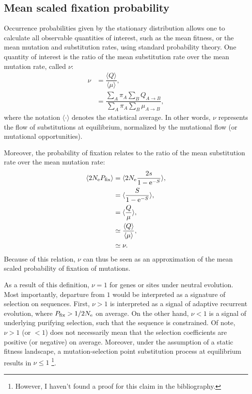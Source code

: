 \subsection{Mean scaled fixation probability}
\label{subsec:mean-scaled-fixation-probability}

Occurrence probabilities given by the stationary distribution allows one to calculate all observable quantities of interest, such as the mean fitness, or the mean mutation and \gls{substitution} rates, using standard probability theory.
One quantity of interest is the ratio of the mean \gls{substitution} rate over the mean mutation rate, called $ \nu $:
\begin{align}
    \nu & = \dfrac{ \langle Q \rangle }{\langle \mu \rangle},
    \label{eq:relative-sub-rate} \\
    & = \dfrac{ \sum\limits_{A} \pi_{A} \sum\limits_{B} Q_{A \to B}}{\sum\limits_{A} \pi_{A}  \sum\limits_{B} \mu_{A \to B}},
\end{align}
where the notation $\langle \cdot \rangle$ denotes the statistical average.
In other words, $ \nu $ represents the flow of substitutions at equilibrium, normalized by the mutational flow (or mutational opportunities).

Moreover, the probability of fixation relates to the ratio of the mean \gls{substitution} rate over the mean mutation rate:
\begin{align}
    \langle  2N_{\textrm{e}} P_{\mathrm{fix}} \rangle & = \langle 2N_{\textrm{e}} \dfrac{ 2 s }{1 - \mathrm{e}^{- S}} \rangle, \\
    & = \langle  \dfrac{ S }{1 - \mathrm{e}^{- S}} \rangle, \\
    & = \langle \dfrac{ Q }{\mu} \rangle, \\
    & \simeq \dfrac{ \langle Q \rangle }{\langle \mu \rangle}, \\
    & \simeq \nu.
\end{align}
Because of this relation, $\nu$ can thus be seen as an approximation of the mean scaled probability of fixation of mutations.

As a result of this definition, $\nu=1$ for genes or sites under \gls{neutral} evolution.
Most importantly, departure from $1$ would be interpreted as a signature of selection on sequences.
First, $\nu>1$ is interpreted as a signal of adaptive recurrent evolution, where $P_{\mathrm{fix}} > 1/2 N_{\textrm{e}}$ on average.
On the other hand, $\nu<1$ is a signal of underlying purifying selection, such that the sequence is constrained.
Of note, $ \nu > 1$ (or $ < 1$) does not necessarily mean that the selection coefficients are positive (or negative) on average.
Moreover, under the assumption of a static fitness landscape, a mutation-selection point \gls{substitution} process at equilibrium results in $\nu \leq 1$ \footnote{However, I haven't found a proof for this claim in the bibliography.}.

